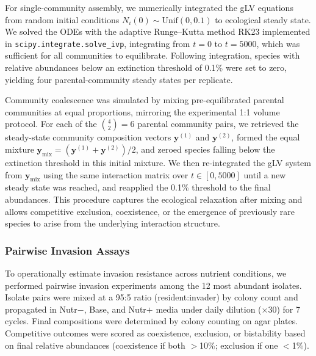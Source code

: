 For single-community assembly, we numerically integrated the gLV equations from random initial conditions $N_i(0) \sim \text{Unif}(0, 0.1)$ to ecological steady state. We solved the ODEs with the adaptive Runge--Kutta method RK23 implemented in \texttt{scipy.integrate.solve\_ivp}, integrating from $t = 0$ to $t = 5000$, which was sufficient for all communities to equilibrate. Following integration, species with relative abundances below an extinction threshold of 0.1\% were set to zero, yielding four parental-community steady states per replicate.

Community coalescence was simulated by mixing pre-equilibrated parental communities at equal proportions, mirroring the experimental 1:1 volume protocol. For each of the $\binom{4}{2} = 6$ parental community pairs, we retrieved the steady-state community composition vectors $\mathbf{y}^{(1)}$ and $\mathbf{y}^{(2)}$, formed the equal mixture $\mathbf{y}_{\text{mix}} = (\mathbf{y}^{(1)} + \mathbf{y}^{(2)})/2$, and zeroed species falling below the extinction threshold in this initial mixture. We then re-integrated the gLV system from $\mathbf{y}_{\text{mix}}$ using the same interaction matrix over $t \in [0, 5000]$ until a new steady state was reached, and reapplied the 0.1\% threshold to the final abundances. This procedure captures the ecological relaxation after mixing and allows competitive exclusion, coexistence, or the emergence of previously rare species to arise from the underlying interaction structure.


\subsubsection*{Pairwise Invasion Assays}
\label{sec:suppl:methods:invasion}

To operationally estimate invasion resistance across nutrient conditions, we performed pairwise invasion experiments among the 12 most abundant isolates. Isolate pairs were mixed at a 95:5 ratio (resident:invader) by colony count and propagated in Nutr$-$, Base, and Nutr$+$ media under daily dilution ($\times$30) for 7 cycles. Final compositions were determined by colony counting on agar plates. Competitive outcomes were scored as coexistence, exclusion, or bistability based on final relative abundances (coexistence if both $>$10\%; exclusion if one $<$1\%). 


